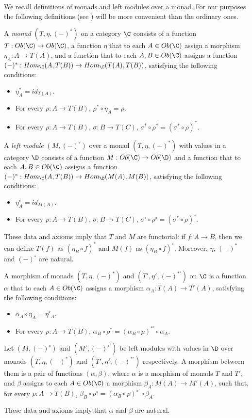 We recall definitions of monads and left modules over a monad.
For our purposes the following definitions (see \cite{manes-algebraic-theories}) will be more convenient than the ordinary ones.
\begin{defn}
A \emph{monad} $(T,\eta,(-)^*)$ on a category $\C$ consists of a function $T : Ob(\C) \to Ob(\C)$,
a function $\eta$ that to each $A \in Ob(\C)$ assign a morphism $\eta_A : A \to T(A)$,
and a function that to each $A,B \in Ob(\C)$ assigns a function $(-)^* : Hom_\C(A,T(B)) \to Hom_\C(T(A),T(B))$, satisfying the following conditions:
\begin{itemize}
\item $\eta_A^* = id_{T(A)}$.
\item For every $\rho : A \to T(B)$, $\rho^* \circ \eta_A = \rho$.
\item For every $\rho : A \to T(B)$, $\sigma : B \to T(C)$, $\sigma^* \circ \rho^* = (\sigma^* \circ \rho)^*$.
\end{itemize}

A \emph{left module} $(M,(-)^\circ)$ over a monad $(T,\eta,(-)^*)$ with values in a category $\D$ consists of a function $M : Ob(\C) \to Ob(\D)$
and a function that to each $A,B \in Ob(\C)$ assigns a function $(-)^\circ : Hom_\C(A,T(B)) \to Hom_\D(M(A),M(B))$, satisfying the following conditions:
\begin{itemize}
\item $\eta_A^\circ = id_{M(A)}$.
\item For every $\rho : A \to T(B)$, $\sigma : B \to T(C)$, $\sigma^\circ \circ \rho^\circ = (\sigma^* \circ \rho)^\circ$.
\end{itemize}
\end{defn}
These data and axioms imply that $T$ and $M$ are functorial: if $f : A \to B$, then we can define $T(f)$ as $(\eta_B \circ f)^*$ and $M(f)$ as $(\eta_B \circ f)^\circ$.
Moreover, $\eta$, $(-)^*$ and $(-)^\circ$ are natural.

\begin{defn}
A morphism of monads $(T,\eta,(-)^*)$ and $(T',\eta',(-)^{*'})$ on $\C$ is a function $\alpha$ that to each $A \in Ob(\C)$ assigns a morphism $\alpha_A : T(A) \to T'(A)$,
satisfying the following conditions:
\begin{itemize}
\item $\alpha_A \circ \eta_A = \eta'_A$.
\item For every $\rho : A \to T(B)$, $\alpha_B \circ \rho^* = (\alpha_B \circ \rho)^{*'} \circ \alpha_A$.
\end{itemize}

Let $(M,(-)^\circ)$ and $(M',(-)^{\circ'})$ be left modules with values in $\D$ over monads $(T,\eta,(-)^*)$ and $(T',\eta',(-)^{*'})$ respectively.
A morphism between them is a pair of functions $(\alpha,\beta)$, where $\alpha$ is a morphism of monads $T$ and $T'$,
and $\beta$ assigns to each $A \in Ob(\C)$ a morphism $\beta_A : M(A) \to M'(A)$,
such that, for every $\rho : A \to T(B)$, $\beta_B \circ \rho^\circ = (\alpha_B \circ \rho)^{\circ'} \circ \beta_A$.
\end{defn}
These data and axioms imply that $\alpha$ and $\beta$ are natural.

